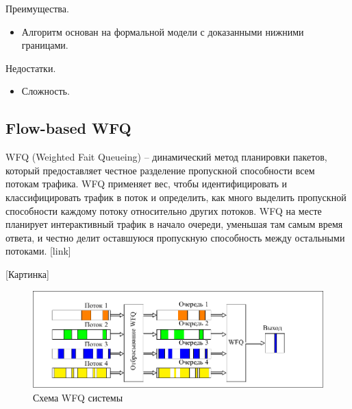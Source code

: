         Преимущества.
        \begin{itemize}
            \item Алгоритм основан на формальной модели с доказанными нижними границами.
        \end{itemize}

        Недостатки.
        \begin{itemize}
            \item Сложность.
        \end{itemize}

    \subsection{Flow-based WFQ}

    WFQ (Weighted Fait Queueing) -- динамический метод планировки пакетов, который
    предоставляет честное разделение пропускной способности всем потокам трафика.
    WFQ применяет вес, чтобы идентифицировать и классифицировать трафик
    в поток и определить, как много выделить пропускной способности каждому
    потоку относительно других потоков. WFQ на месте планирует интерактивный трафик в начало очереди,
    уменьшая там самым время ответа, и честно делит оставшуюся пропускную
    способность между остальными потоками. 
    [link]

    [Картинка]
    
    \begin{figure}[ht!]
			\center
        \includegraphics{./pdfimages/fwfq.pdf}
        \caption{Схема WFQ системы}
    \end{figure}


